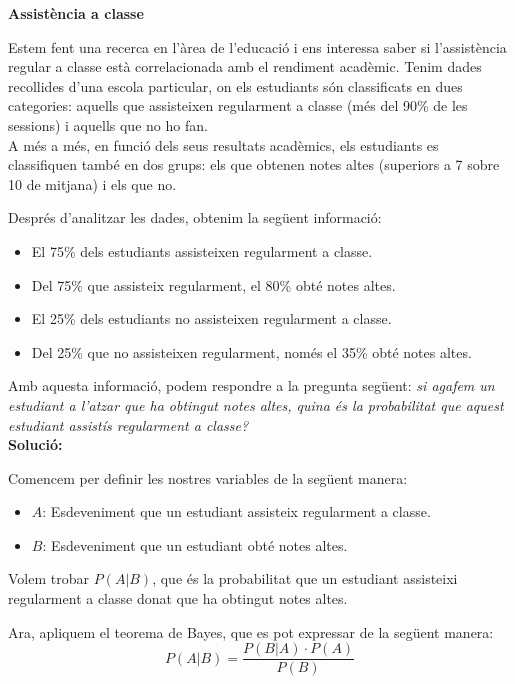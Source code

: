 \documentclass[12pt]{article}
\begin{document}
\begin{exemple} [title=Exemple 1] \noindent 
\textbf{Assistència a classe}

Estem fent una recerca en l'àrea de l'educació i ens interessa saber si l'assistència regular a classe està correlacionada amb el rendiment acadèmic. Tenim dades recollides d'una escola particular, on els estudiants són classificats en dues categories: aquells que assisteixen regularment a classe (més del 90\% de les sessions) i aquells que no ho fan.\\

A més a més, en funció dels seus resultats acadèmics, els estudiants es classifiquen també en dos grups: els que obtenen notes altes (superiors a 7 sobre 10 de mitjana) i els que no.

Després d'analitzar les dades, obtenim la següent informació:
\begin{itemize}
    \item El 75\% dels estudiants assisteixen regularment a classe.
    \item Del 75\% que assisteix regularment, el 80\% obté notes altes.
    \item El 25\% dels estudiants no assisteixen regularment a classe.
    \item Del 25\% que no assisteixen regularment, només el 35\% obté notes altes.
\end{itemize}

Amb aquesta informació, podem respondre a la pregunta següent: \textit{si agafem un estudiant a l'atzar que ha obtingut notes altes, quina és la probabilitat que aquest estudiant assistís regularment a classe?}\\


\textbf{Solució:}

Comencem per definir les nostres variables de la següent manera:
\begin{itemize}
    \item \( A \): Esdeveniment que un estudiant assisteix regularment a classe.
    \item \( B \): Esdeveniment que un estudiant obté notes altes.
\end{itemize}

Volem trobar \( P(A|B) \), que és la probabilitat que un estudiant assisteixi regularment a classe donat que ha obtingut notes altes.

Ara, apliquem el teorema de Bayes, que es pot expressar de la següent manera:
\[
P(A|B) = \frac{P(B|A) \cdot P(A)}{P(B)}
\]


\end{exemple}
\end{document}
